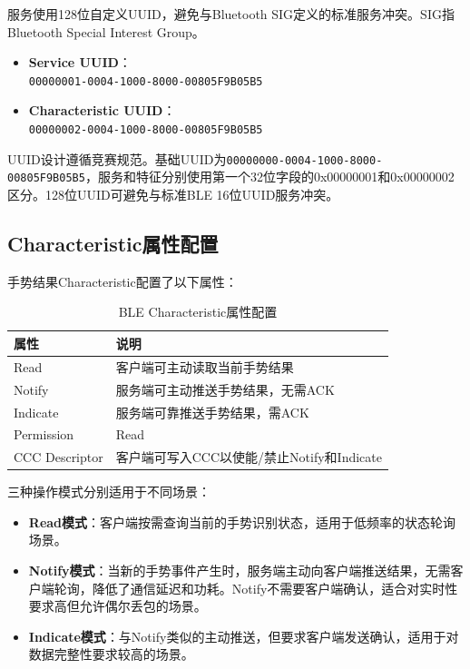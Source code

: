 \documentclass[lettersize,journal]{IEEEtran}
\begin{document}
服务使用128位自定义UUID，避免与Bluetooth SIG定义的标准服务冲突。SIG指Bluetooth Special Interest Group。

\begin{itemize}[leftmargin=*]
    \item \textbf{Service UUID}：\\ \texttt{00000001-0004-1000-8000-00805F9B05B5}
    \item \textbf{Characteristic UUID}：\\ \texttt{00000002-0004-1000-8000-00805F9B05B5}
\end{itemize}

UUID设计遵循竞赛规范。基础UUID为\texttt{00000000-0004-1000-8000-00805F9B05B5}，服务和特征分别使用第一个32位字段的0x00000001和0x00000002区分。128位UUID可避免与标准BLE 16位UUID服务冲突。

\subsection{Characteristic属性配置}

手势结果Characteristic配置了以下属性：

\begin{table}[htbp]
    \centering
    \caption{BLE Characteristic属性配置}
    \label{tab:ble_char}
    \begin{tabular}{lp{5.5cm}}
        \toprule
        \textbf{属性} & \textbf{说明} \\
        \midrule
        Read         & 客户端可主动读取当前手势结果 \\
        Notify       & 服务端可主动推送手势结果，无需ACK \\
        Indicate     & 服务端可靠推送手势结果，需ACK \\
        \midrule
        Permission   & Read \\
        CCC Descriptor & 客户端可写入CCC以使能/禁止Notify和Indicate \\
        \bottomrule
    \end{tabular}
\end{table}

三种操作模式分别适用于不同场景：
\begin{itemize}[leftmargin=*]
    \item \textbf{Read模式}：客户端按需查询当前的手势识别状态，适用于低频率的状态轮询场景。
    \item \textbf{Notify模式}：当新的手势事件产生时，服务端主动向客户端推送结果，无需客户端轮询，降低了通信延迟和功耗。Notify不需要客户端确认，适合对实时性要求高但允许偶尔丢包的场景。
    \item \textbf{Indicate模式}：与Notify类似的主动推送，但要求客户端发送确认，适用于对数据完整性要求较高的场景。
\end{itemize}
\end{document}
